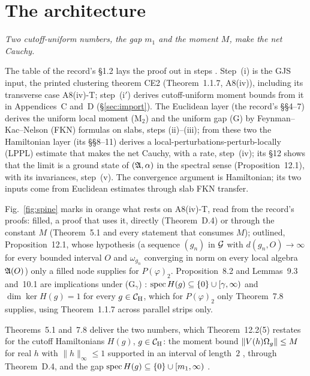 \section{The architecture}\label{sec:architecture}

\emph{Two cutoff-uniform numbers, the gap $m_1$ and the moment $M$, make the net Cauchy.}

The table of the record's \S1.2 lays the proof out in steps . Step~(i)
is the GJS input, the printed clustering theorem CE2 (Theorem~1.1.7, A8(iv)), including
its transverse case A8(iv)-T; step~(i$'$) derives cutoff-uniform moment bounds from it in
Appendices~C and~D (\S\ref{sec:import}). The Euclidean layer (the record's \S\S4--7)
derives the uniform local moment (M$_2$) and the uniform gap (G) by
Feynman--Kac--Nelson (FKN) formulas on slabs, steps (ii)--(iii); from these two the
Hamiltonian layer (its \S\S8--11) derives a local-perturbations-perturb-locally (LPPL)
estimate that makes the net Cauchy, with a rate, step~(iv); its \S12 shows that the limit
is a ground state of $(\mathfrak{A},\alpha)$ in the spectral sense (Proposition~12.1), with its
invariances, step~(v). The convergence argument is Hamiltonian; its two inputs come from
Euclidean estimates through slab FKN transfer.

Fig.~\ref{fig:spine} marks in orange what rests on A8(iv)-T, read from the record's proofs:
filled, a proof that uses it, directly (Theorem~D.4) or through the constant $M$
(Theorem~5.1 and every statement that consumes $M$); outlined, Proposition~12.1, whose
hypothesis (a sequence $(g_n)$ in $\mathcal{G}$ with $d(g_n,O)\to\infty$ for every bounded interval
$O$ and $\omega_{g_n}$ converging in norm on every local algebra $\mathfrak{A}(O)$) only a filled
node supplies for $P(\varphi)_2$. Proposition~8.2 and Lemmas~9.3 and~10.1 are implications
under (G$_\gamma$) : $\operatorname{spec} H(g)\subseteq\{0\}\cup[\gamma,\infty)$ and
$\dim\ker H(g)=1$ for every $g\in\mathcal{C}_{\mathrm H}$, which for $P(\varphi)_2$ only Theorem~7.8 supplies,
using Theorem~1.1.7 across parallel strips only.

Theorems~5.1 and~7.8 deliver the two numbers, which Theorem~12.2(5) restates for the
cutoff Hamiltonians $H(g)$, $g\in\mathcal{C}_{\mathrm H}$: the moment bound $\|V(h)\Omega_g\|\le M$ for real
$h$ with $\|h\|_\infty\le1$ supported in an interval of length~$2$ ,  through
Theorem~D.4, and the gap $\operatorname{spec} H(g)\subseteq\{0\}\cup[m_1,\infty)$
.

